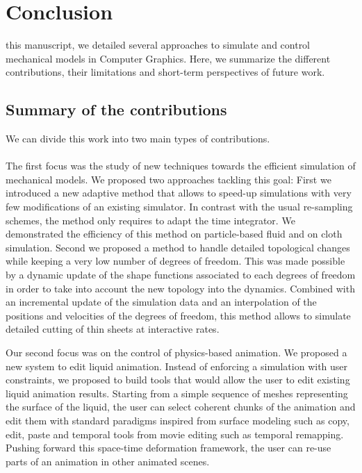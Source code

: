 \chapter{Conclusion}
\label{chap:conclusion}

 this manuscript, we detailed several approaches to simulate and control mechanical models in Computer Graphics. 
Here, we summarize the different contributions, their limitations and short-term perspectives of future work.

\section{Summary of the contributions}
We can divide this work into two main types of contributions.
\\ \\
The first focus was the study of new techniques towards the efficient simulation of mechanical models. 
We proposed two approaches tackling this goal: 
First we introduced a new adaptive method that allows to speed-up simulations with very few modifications of an existing simulator. 
In contrast with the usual re-sampling schemes, the method only requires to adapt the time integrator. 
We demonstrated the efficiency of this method on particle-based fluid and on cloth simulation.
Second we proposed a method to handle detailed topological changes while keeping a very low number of degrees of freedom. 
This was made possible by a dynamic update of the shape functions associated to each degrees of freedom in order to take into account the new topology into the dynamics. 
Combined with an incremental update of the simulation data and an interpolation of the positions and velocities of the degrees of freedom, this method allows to simulate detailed cutting of thin sheets at interactive rates.

Our second focus was on the control of physics-based animation. We proposed a new system to edit liquid animation. 
Instead of enforcing a simulation with user constraints, we proposed to build tools that would allow the user to edit existing liquid animation results. 
Starting from a simple sequence of meshes representing the surface of the liquid, the user can select coherent chunks of the animation and edit them with standard paradigms inspired from surface modeling such as copy, edit, paste and temporal tools from movie editing such as temporal remapping. 
Pushing forward this space-time deformation framework, the user can re-use parts of an animation in other animated scenes.

